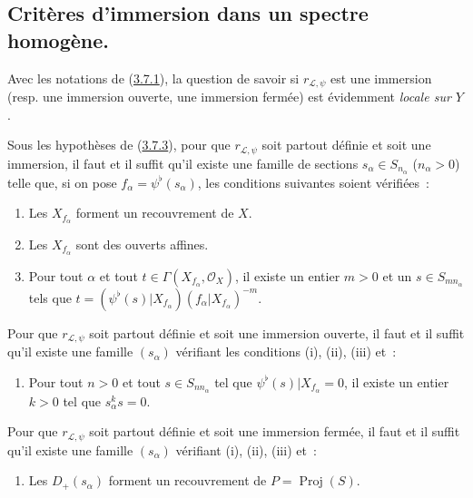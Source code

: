 
\subsection{Critères d'immersion dans un spectre homogène.}
\label{subsection:II.3.8-fr}

\begin{env}[3.8.1]
\label{II.3.8.1-fr}
Avec les notations de (\hyperref[II.3.7.1-fr]{3.7.1}), la question de savoir
si $r_{\mathcal{L},\psi}$ est une immersion (resp. une immersion ouverte, une
immersion fermée) est évidemment \emph{locale sur $Y$}.
\end{env}

\begin{proposition}[3.8.2]
\label{II.3.8.2-fr}
Sous les hypothèses de (\hyperref[II.3.7.3-fr]{3.7.3}), pour que
$r_{\mathcal{L},\psi}$ soit partout définie et soit une immersion, il faut et
il suffit qu'il existe une famille de sections $s_\alpha\in S_{n_\alpha}$
($n_\alpha>0$) telle que, si on pose
$f_\alpha=\psi^\flat(s_\alpha)$, les conditions suivantes soient vérifiées~:
\begin{enumerate}
  \item[(i)] Les $X_{f_\alpha}$ forment un recouvrement de $X$.
  \item[(ii)] Les $X_{f_\alpha}$ sont des ouverts affines.
  \item[(iii)] Pour tout $\alpha$ et tout
    $t\in\Gamma(X_{f_\alpha},\mathcal{O}_X)$, il existe un entier $m>0$ et
    un $s\in S_{mn_\alpha}$ tels que
    $t=(\psi^\flat(s)|X_{f_\alpha})(f_\alpha|X_{f_\alpha})^{-m}$.
\end{enumerate}

Pour que $r_{\mathcal{L},\psi}$ soit partout définie et soit une immersion
ouverte, il faut et il suffit qu'il existe une famille $(s_\alpha)$ vérifiant
les conditions (i), (ii), (iii) et~:
\begin{enumerate}
  \item[(iv)] Pour tout $n>0$ et tout $s\in S_{nn_\alpha}$ tel que
    $\psi^\flat(s)|X_{f_\alpha}=0$, il existe un entier $k>0$ tel que
    $s_\alpha^ks=0$.
\end{enumerate}

Pour que $r_{\mathcal{L},\psi}$ soit partout définie et soit une immersion
fermée, il faut et il suffit qu'il existe une famille $(s_\alpha)$ vérifiant
(i), (ii), (iii) et~:
\begin{enumerate}
  \item[(v)] Les $D_+(s_\alpha)$ forment un recouvrement de
    $P=\operatorname{Proj}(S)$.
\end{enumerate}
\end{proposition}

